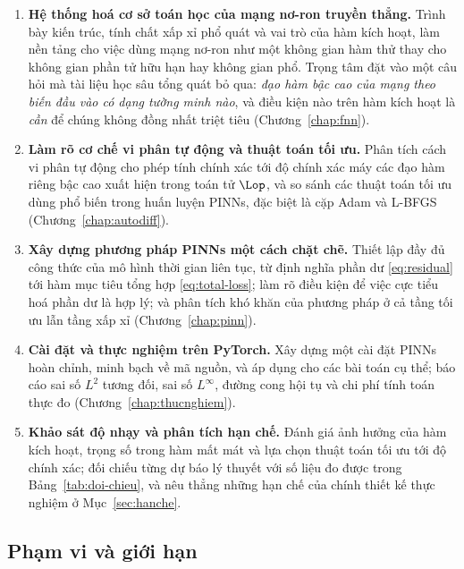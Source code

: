 \begin{enumerate}[label=\textbf{MT\arabic*.},leftmargin=*,itemsep=5pt]
\item \textbf{Hệ thống hoá cơ sở toán học của mạng nơ-ron truyền thẳng.} Trình bày
kiến trúc, tính chất xấp xỉ phổ quát và vai trò của hàm kích hoạt, làm nền tảng
cho việc dùng mạng nơ-ron như một không gian hàm thử thay cho không gian phần tử
hữu hạn hay không gian phổ. Trọng tâm đặt vào một câu hỏi mà tài liệu học sâu tổng
quát bỏ qua: \emph{đạo hàm bậc cao của mạng theo biến đầu vào có dạng tường minh
nào}, và điều kiện nào trên hàm kích hoạt là \emph{cần} để chúng không đồng nhất
triệt tiêu (Chương~\ref{chap:fnn}).
 
\item \textbf{Làm rõ cơ chế vi phân tự động và thuật toán tối ưu.} Phân tích cách
vi phân tự động cho phép tính chính xác tới độ chính xác máy các đạo hàm riêng bậc
cao xuất hiện trong toán tử $\Lop$, và so sánh các thuật toán tối ưu dùng phổ biến
trong huấn luyện PINNs, đặc biệt là cặp Adam và L-BFGS
(Chương~\ref{chap:autodiff}).
 
\item \textbf{Xây dựng phương pháp PINNs một cách chặt chẽ.} Thiết lập đầy đủ công
thức của mô hình thời gian liên tục, từ định nghĩa phần dư \eqref{eq:residual} tới
hàm mục tiêu tổng hợp \eqref{eq:total-loss}; làm rõ điều kiện để việc cực tiểu hoá
phần dư là hợp lý; và phân tích khó khăn của phương pháp ở cả tầng tối ưu lẫn tầng
xấp xỉ (Chương~\ref{chap:pinn}).
 
\item \textbf{Cài đặt và thực nghiệm trên PyTorch.} Xây dựng một cài đặt PINNs
hoàn chỉnh, minh bạch về mã nguồn, và áp dụng cho các bài toán cụ thể; báo cáo sai
số $L^2$ tương đối, sai số $L^{\infty}$, đường cong hội tụ và chi phí tính toán
thực đo (Chương~\ref{chap:thucnghiem}).
 
\item \textbf{Khảo sát độ nhạy và phân tích hạn chế.} Đánh giá ảnh hưởng của hàm
kích hoạt, trọng số trong hàm mất mát và lựa chọn thuật toán tối ưu tới độ chính
xác; đối chiếu từng dự báo lý thuyết với số liệu đo được trong
Bảng~\ref{tab:doi-chieu}, và nêu thẳng những hạn chế của chính thiết kế thực
nghiệm ở Mục~\ref{sec:hanche}.
\end{enumerate}
 
\subsection{Phạm vi và giới hạn}
\label{subsec:pham-vi}
 
